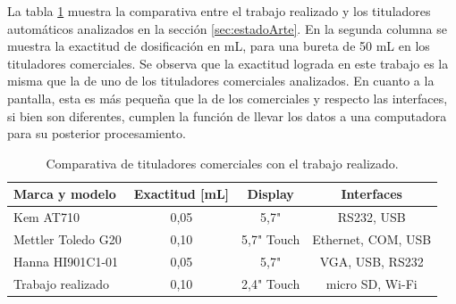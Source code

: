 La tabla \ref{tab:titComparativa} muestra la comparativa entre el trabajo realizado y los tituladores automáticos analizados en la sección \ref{sec:estadoArte}. En la segunda columna se muestra la exactitud de dosificación en mL, para una bureta de 50 mL en los tituladores comerciales. Se observa que la exactitud lograda en este trabajo es la misma que la de uno de los tituladores comerciales analizados. En cuanto a la pantalla, esta es más pequeña que la de los comerciales y respecto las interfaces, si bien son diferentes, cumplen la función de llevar los datos a una computadora para su posterior procesamiento.

\begin{table}[h]
	\centering
	\caption[Comparativa con el trabajo realizado.]{Comparativa de tituladores comerciales con el trabajo realizado.}
	\begin{tabular}{l c c c }    
		\toprule
		\textbf{Marca y modelo} & \textbf{Exactitud [mL]}	&    \textbf{Display }&\textbf{Interfaces}  \\
		\midrule
		Kem AT710 		 	& 0,05 & 5,7" 		& RS232, USB \\		
		Mettler Toledo G20	& 0,10 & 5,7" Touch	& Ethernet, COM, USB \\
		Hanna HI901C1-01	 	& 0,05 & 5,7"		& VGA, USB, RS232 \\
		Trabajo realizado 	& 0,10 & 2,4" Touch	& micro SD, Wi-Fi \\
		\bottomrule
		\hline
	\end{tabular}
	\label{tab:titComparativa}
\end{table}